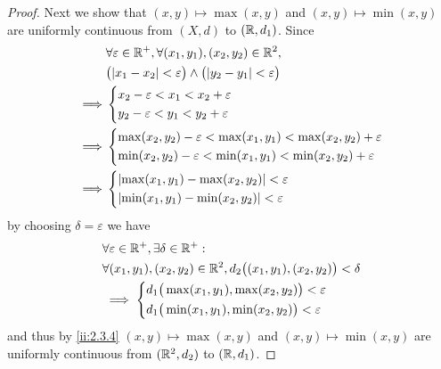 \begin{proof}
  Next we show that \((x, y) \mapsto \max(x, y)\) and \((x, y) \mapsto \min(x, y)\) are uniformly continuous from \((X, d)\) to \((\mathbb{R}, d_1)\).
  Since
  \begin{align*}
             & \forall \varepsilon \in \R^+, \forall (x_1, y_1), (x_2, y_2) \in \R^2,                \\
             & \big(\abs{x_1 - x_2} < \varepsilon\big) \land \big(\abs{y_2 - y_1} < \varepsilon\big) \\
    \implies & \begin{dcases}
                 x_2 - \varepsilon < x_1 < x_2 + \varepsilon \\
                 y_2 - \varepsilon < y_1 < y_2 + \varepsilon \\
               \end{dcases}                                           \\
    \implies & \begin{dcases}
                 \max(x_2, y_2) - \varepsilon < \max(x_1, y_1) < \max(x_2, y_2) + \varepsilon \\
                 \min(x_2, y_2) - \varepsilon < \min(x_1, y_1) < \min(x_2, y_2) + \varepsilon
               \end{dcases}          \\
    \implies & \begin{dcases}
                 \abs{\max(x_1, y_1) - \max(x_2, y_2)} < \varepsilon \\
                 \abs{\min(x_1, y_1) - \min(x_2, y_2)} < \varepsilon
               \end{dcases}
  \end{align*}
  by choosing \(\delta = \varepsilon\) we have
  \begin{align*}
     & \forall \varepsilon \in \mathbb{R}^+, \exists \delta \in \mathbb{R}^+ :                               \\
     & \forall (x_1, y_1), (x_2, y_2) \in \mathbb{R}^2, d_2\big((x_1, y_1), (x_2, y_2)\big) < \delta \\
     & \implies \begin{dcases}
                  d_1\big(\max(x_1, y_1), \max(x_2, y_2)\big) < \varepsilon \\
                  d_1\big(\min(x_1, y_1), \min(x_2, y_2)\big) < \varepsilon
                \end{dcases}
  \end{align*}
  and thus by \cref{ii:2.3.4} \((x, y) \mapsto \max(x, y)\) and \((x, y) \mapsto \min(x, y)\) are uniformly continuous from \((\mathbb{R}^2, d_2)\) to \((\mathbb{R}, d_1)\).


\end{proof}
